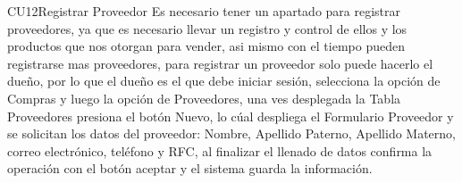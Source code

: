 \begin{UseCase}{CU12}{Registrar Proveedor}{
		Es necesario tener un apartado para registrar proveedores, ya que es necesario llevar un registro y control de ellos y los productos que nos otorgan para vender, asi mismo con el tiempo pueden registrarse mas proveedores, para registrar un proveedor solo puede hacerlo el dueño, por lo que el dueño es el que debe iniciar sesión, selecciona la opción de Compras y luego la opción de Proveedores, una ves desplegada la Tabla Proveedores presiona el botón Nuevo, lo cúal despliega el Formulario Proveedor y se solicitan los datos del proveedor: Nombre, Apellido Paterno, Apellido Materno, correo electrónico, teléfono y RFC, al finalizar el llenado de datos confirma la operación con el botón aceptar y el sistema guarda la información. 
	}
	\end{UseCase}
